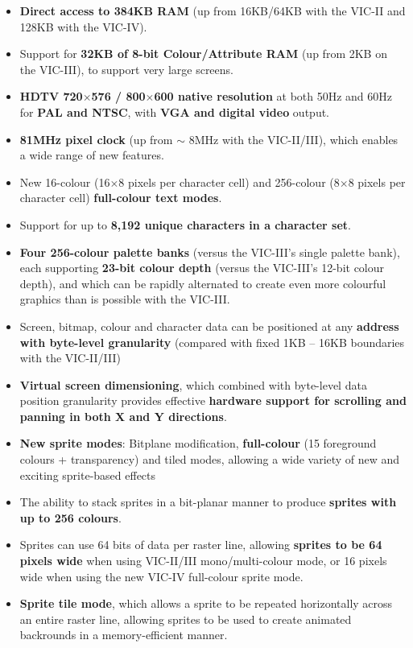 \begin{itemize}
\item {\bf Direct access to 384KB RAM} (up from 16KB/64KB with the VIC-II and 128KB
  with the VIC-IV).
\item Support for {\bf 32KB of 8-bit Colour/Attribute RAM} (up from 2KB on the VIC-III), to
  support very large screens.
\item {\bf HDTV 720$\times$576 / 800$\times$600 native resolution} at both 50Hz and 60Hz for {\bf PAL and NTSC}, with {\bf VGA and digital video} output.
\item {\bf 81MHz pixel clock} (up from $\sim$ 8MHz with the VIC-II/III), which enables a wide range of new features.
\item New 16-colour (16$\times$8 pixels per character cell) and 256-colour (8$\times$8 pixels per character cell) {\bf full-colour text modes}.
\item Support for up to {\bf 8,192 unique characters in a character set}.
\item {\bf Four 256-colour palette banks} (versus the VIC-III's single palette bank), each supporting {\bf 23-bit colour depth} (versus the VIC-III's 12-bit colour depth), and which can be rapidly alternated to create even more colourful graphics than is possible with the VIC-III.
\item Screen, bitmap, colour and character data can be positioned at any {\bf address with byte-level granularity} (compared with fixed 1KB -- 16KB boundaries with the VIC-II/III)
\item {\bf Virtual screen dimensioning}, which combined with byte-level data position granularity provides effective {\bf hardware support for scrolling and panning in both X and Y directions}.
\item {\bf New sprite modes}: Bitplane modification, {\bf full-colour} (15 foreground colours + transparency) and tiled modes, allowing a wide variety of new and exciting sprite-based effects
  \item The ability to stack sprites in a bit-planar manner to produce {\bf sprites with up to 256 colours}.
\item Sprites can use 64 bits of data per raster line, allowing {\bf sprites to be 64 pixels wide} when using VIC-II/III mono/multi-colour mode, or 16 pixels wide when using the new VIC-IV full-colour sprite mode.
\item {\bf Sprite tile mode}, which allows a sprite to be repeated horizontally across an entire raster line, allowing sprites to be used to create  animated backrounds in a memory-efficient manner.

\end{itemize}
